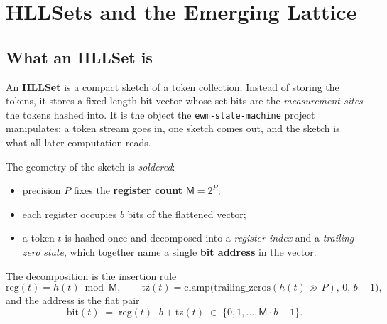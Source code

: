 \documentclass[11pt,a4paper]{article}
\theoremstyle{remark}
\newcommand{\Reg}{\ensuremath{\mathsf{M}}}          %
\newcommand{\Prec}{\ensuremath{P}}                  %
\newcommand{\Bits}{\ensuremath{b}}                  %
\begin{document}
\section{HLLSets and the Emerging Lattice}
\label{sec:lattice}

\subsection{What an HLLSet is}

An \textbf{HLLSet} is a compact sketch of a token collection. Instead of storing
the tokens, it stores a fixed-length bit vector whose set bits are the
\emph{measurement sites} the tokens hashed into. It is the object the
\texttt{ewm-state-machine} project manipulates: a token stream goes in, one
sketch comes out, and the sketch is what all later computation reads.

The geometry of the sketch is \emph{soldered}:
\begin{itemize}[leftmargin=*,nosep]
  \item precision $\Prec$ fixes the \textbf{register count} $\Reg = 2^{\Prec}$;
  \item each register occupies $\Bits$ bits of the flattened vector;
  \item a token $t$ is hashed once and decomposed into a \emph{register index}
    and a \emph{trailing-zero state}, which together name a single
    \textbf{bit address} in the vector.
\end{itemize}

The decomposition is the insertion rule
\begin{equation}
  \label{eq:position}
  \mathrm{reg}(t) = h(t) \bmod \Reg,
  \qquad
  \mathrm{tz}(t) = \mathrm{clamp}\bigl(\mathrm{trailing\_zeros}(h(t) \gg \Prec),\,
  0,\, \Bits-1\bigr),
\end{equation}
and the address is the flat pair
\begin{equation}
  \label{eq:bit}
  \mathrm{bit}(t) \;=\; \mathrm{reg}(t)\cdot \Bits + \mathrm{tz}(t)
  \;\in\; \{0,1,\dots,\Reg\cdot\Bits-1\}.
\end{equation}
\end{document}

